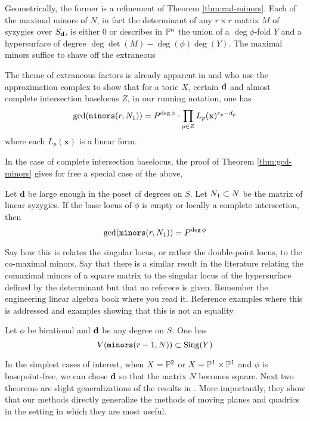 \documentclass[fleqn,reqno]{amsart}
\numberwithin{first}{chapter}
\begin{document}
\begin{paragraf*}
Geometrically, the former is a refinement of Theorem \ref{thm:rad-minors}.
Each of the maximal minors of $N$, in fact
the determinant of any $r\times r$ matrix $M$ of syzygies over $S_\mathbf d$, is either $0$
or describes in $\mathbb{P}^n$ the union of a $\deg\phi$-fold $Y$ and
a hypersurface of degree $\deg\det(M)-\deg(\phi)\deg(Y)$.
The maximal minors suffice to shave off the extraneous 

The theme of extraneous factors is already apparent in \citet{BCJ09} and \citet{Botbol2011}
who use the approximation complex to show that for a toric $X$,
certain $\mathbf d$ and almost complete intersection baselocus $Z$, in our running notation, one has
\[
\gcd(\mathop{\tt minors}(r,N_1))=P^{\deg\phi}\cdot\prod_{p\in Z} L_p(\mathbf x)^{e_p-d_p}
\]
where each $L_p(\mathbf x)$ is a linear form.

In the case of complete intersection baselocus, the proof of Theorem \ref{thm:gcd-minors}
gives for free a special case of the above,
\end{paragraf*}

\begin{corollary}
\label{cor:approx-complex}
Let $\mathbf d$ be large enough in the poset of degrees on $S$.
Let $N_1\subset N$ be the matrix of linear syzygies.
If the base locus of $\phi$ is empty or locally a complete intersection, then
\[
	\gcd(\mathop{\tt minors}(r, N_1))=P^{\deg\phi}
\]
\end{corollary}

\begin{paragraf*}
Say how this is relates the singular locus, or rather the double-point locus,
to the co-maximal minors.
Say that there is a similar result in the literature relating the comaximal minors
of a square matrix to the singular locus of the hypersurface defined by the determinant
but that no referece is given.
Remember the engineering linear algebra book where you read it.
Reference examples where this is addressed and examples showing that this is not
an equality.
\end{paragraf*}

\begin{conjecture}
\label{conj:sing-locus}
Let $\phi$ be birational and $\mathbf d$ be any degree on $S$. One has
\[
V(\mathop{\tt minors}(r-1,N))\subset\mathrm{Sing}(Y)
\]
\end{conjecture}



\begin{paragraf*}
In the simplest cases of interest, when $X=\mathbb{P}^2$ or $X=\mathbb{P}^1\times\mathbb{P}^1$ and $\phi$ is basepoint-free,
we can chose $\mathbf d$ so that the matrix $N$ becomes square.
Next two theorems are slight generalizations of the results in \citet{00-CGZ-JSC}.
More importantly, they show that our methods directly generalize the methods of
moving planes and quadrics in the setting in which they are most useful.
\end{paragraf*}
\end{document}
